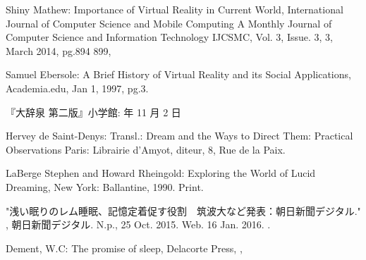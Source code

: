 \begin{bib}[100]



\begin{flushleft}
  Shiny Mathew:
  \newblock Importance of Virtual Reality in Current World,
  \newblock International Journal of Computer Science and Mobile Computing A Monthly Journal of Computer Science and Information Technology IJCSMC, Vol. 3, Issue. 3, 3, March 2014, pg.894  899,
\end{flushleft}

\begin{flushleft}
  Samuel Ebersole:
  \newblock A Brief History of Virtual Reality and its Social Applications, Academia.edu,
  \newblock Jan 1, 1997,  pg.3.
\end{flushleft}

\begin{flushleft}
『大辞泉 第二版』小学館:
   年 11 月 2 日
 \end{flushleft}

\begin{flushleft}
Hervey de Saint-Denys:
  \newblock Transl.: Dream and the Ways to Direct Them: Practical Observations
  \newblock Paris: Librairie d'Amyot, diteur, 8, Rue de la Paix.
 \end{flushleft}
 
\begin{flushleft}
 LaBerge Stephen and Howard Rheingold:
  \newblock Exploring the World of Lucid Dreaming,
  \newblock New York: Ballantine, 1990. Print.
 \end{flushleft}
 
\begin{flushleft}
   \newblock "浅い眠りのレム睡眠、記憶定着促す役割　筑波大など発表：朝日新聞デジタル." ,
  \newblock 朝日新聞デジタル. N.p., 25 Oct. 2015.
  \newblock Web. 16 Jan. 2016.
  .
\end{flushleft}

\begin{flushleft}
  Dement, W.C:
  \newblock  The promise of sleep,
  \newblock Delacorte Press,
  ,
 \end{flushleft}
 

\end{bib}
